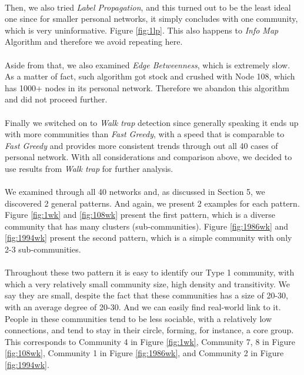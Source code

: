 \paragraph{}
Then, we also tried \textit{Label Propagation}, and this turned out to be the least ideal one since for smaller personal networks, it simply concludes with one community, which is very uninformative. Figure \ref{fig:1lp}. This also happens to \textit{Info Map} Algorithm and therefore we avoid repeating here.
\paragraph{}
Aside from that, we also examined \textit{Edge Betweenness}, which is extremely slow. As a matter of fact, such algorithm got stock and crushed with Node 108, which has 1000+ nodes in its personal network. Therefore we abandon this algorithm and did not proceed further.
\paragraph{}
Finally we switched on to \textit{Walk trap} detection since generally speaking it ends up with more communities than \textit{Fast Greedy}, with a speed that is comparable to \textit{Fast Greedy} and provides more consistent trends through out all 40 cases of personal network. With all considerations and comparison above, we decided to use results from \textit{Walk trap} for further analysis.
\paragraph{}
We examined through all 40 networks and, as discussed in Section 5, we discovered 2 general patterns. And again, we present 2 examples for each pattern. Figure \ref{fig:1wk} and \ref{fig:108wk} present the first pattern, which is a diverse community that has many clusters (sub-communities). Figure \ref{fig:1986wk} and \ref{fig:1994wk} present the second pattern, which is a simple community with only 2-3 sub-communities.
\paragraph{}
Throughout these two pattern it is easy to identify our Type 1 community, with which a very relatively small community size, high density and transitivity. We say they are small, despite the fact that these communities has a size of 20-30, with an average degree of 20-30. And we can easily find real-world link to it. People in these communities tend to be less sociable, with a relatively low connections, and tend to stay in their circle, forming, for instance, a core group. This corresponds to Community 4 in Figure \ref{fig:1wk}, Community 7, 8 in Figure \ref{fig:108wk}, Community 1 in Figure \ref{fig:1986wk}, and Community 2 in Figure \ref{fig:1994wk}.

